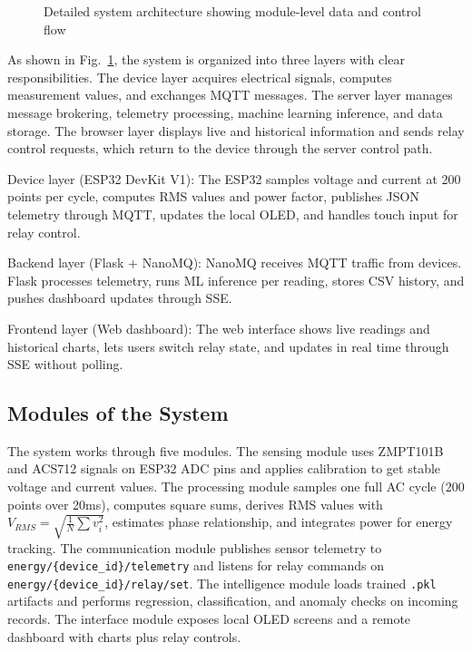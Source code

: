 \documentclass[12pt, a4paper]{article}
\numberwithin{figure}{section}
\numberwithin{table}{section}
\begin{document}
\begin{figure}[H]
{%
		}
		\caption{Detailed system architecture showing module-level data and control flow}
		\label{fig:architecture}
	\end{figure}
	
	As shown in Fig.~\ref{fig:architecture}, the system is organized into three layers with clear responsibilities. The device layer acquires electrical signals, computes measurement values, and exchanges MQTT messages. The server layer manages message brokering, telemetry processing, machine learning inference, and data storage. The browser layer displays live and historical information and sends relay control requests, which return to the device through the server control path.
	
	Device layer (ESP32 DevKit V1): The ESP32 samples voltage and current at 200 points per cycle, computes RMS values and power factor, publishes JSON telemetry through MQTT, updates the local OLED, and handles touch input for relay control.
	
	Backend layer (Flask + NanoMQ): NanoMQ receives MQTT traffic from devices. Flask processes telemetry, runs ML inference per reading, stores CSV history, and pushes dashboard updates through SSE.
	
	Frontend layer (Web dashboard): The web interface shows live readings and historical charts, lets users switch relay state, and updates in real time through SSE without polling.
	
	\subsection{Modules of the System}
	
	The system works through five modules. The sensing module uses ZMPT101B and ACS712 signals on ESP32 ADC pins and applies calibration to get stable voltage and current values. The processing module samples one full AC cycle (200 points over 20ms), computes square sums, derives RMS values with $V_{RMS} = \sqrt{\frac{1}{N}\sum v_i^2}$, estimates phase relationship, and integrates power for energy tracking. The communication module publishes sensor telemetry to \texttt{energy/\{device\_id\}/telemetry} and listens for relay commands on \texttt{energy/\{device\_id\}/relay/set}. The intelligence module loads trained \texttt{.pkl} artifacts and performs regression, classification, and anomaly checks on incoming records. The interface module exposes local OLED screens and a remote dashboard with charts plus relay controls.
	
\end{document}
